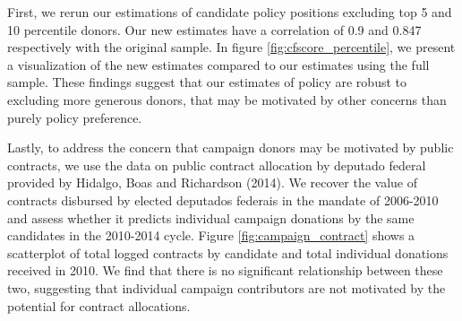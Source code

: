 \documentclass[12pt,english]{article}
\numberwithin{equation}{section}
\theoremstyle{plain}
\theoremstyle{remark}
\theoremstyle{plain}
\begin{document}
First, we rerun our estimations of candidate policy positions excluding top 5 and 10 percentile donors. Our new estimates have a correlation of 0.9 and 0.847 respectively with the original sample. In figure \ref{fig:cfscore_percentile}, we present a visualization of the new estimates compared to our estimates using the full sample. These findings suggest that our estimates of policy are robust to excluding more generous donors, that may be motivated by other concerns than purely policy preference.

Lastly, to address the concern that campaign donors may be motivated by public contracts, we use the data on public contract allocation by deputado federal provided by Hidalgo, Boas and Richardson (2014). We recover the value of contracts disbursed by elected deputados federais in the mandate of 2006-2010 and assess whether it predicts individual campaign donations by the same candidates in the 2010-2014 cycle. Figure \ref{fig:campaign_contract} shows a scatterplot of total logged contracts by candidate and total individual donations received in 2010. We find that there is no significant relationship between these two, suggesting that individual campaign contributors are not motivated by the potential for contract allocations.

 
 
\end{document}
